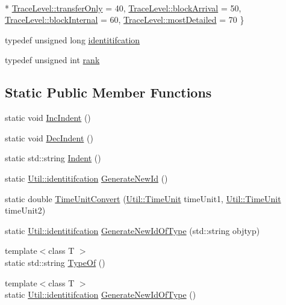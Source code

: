 \begin{DoxyCompactItemize}
\\*
\hyperlink{class_util_a0a3482cfa2d915e261c0cf528fdc7afca0a2e7262b7e0ff948fd4a57e7cb178b6}{Trace\-Level\-::transfer\-Only} = 40, 
\hyperlink{class_util_a0a3482cfa2d915e261c0cf528fdc7afcaa784e286f1dae00f9b31823faa5ee90b}{Trace\-Level\-::block\-Arrival} = 50, 
\hyperlink{class_util_a0a3482cfa2d915e261c0cf528fdc7afca08756a99ac8340cce8bab9de954d738e}{Trace\-Level\-::block\-Internal} = 60, 
\hyperlink{class_util_a0a3482cfa2d915e261c0cf528fdc7afcaac18d2ea075dba67f95df9a907eee741}{Trace\-Level\-::most\-Detailed} = 70
 \}
\item 
typedef unsigned long \hyperlink{class_util_ad17d458d9344b10bba64347e514d6d71}{identitifcation}
\item 
typedef unsigned int \hyperlink{class_util_a2a402b3a3a889d699bb3a1a87cbe6d1e}{rank}
\end{DoxyCompactItemize}
\subsection*{Static Public Member Functions}
\begin{DoxyCompactItemize}
\item 
static void \hyperlink{class_util_a8110241a80979c8fbecca95eef59e9ad}{Inc\-Indent} ()
\item 
static void \hyperlink{class_util_a702d44544c3dd604b81e578ee9ee713f}{Dec\-Indent} ()
\item 
static std\-::string \hyperlink{class_util_a13a4cb5dbc88ef5e2c3a127362b956d6}{Indent} ()
\item 
static \hyperlink{class_util_ad17d458d9344b10bba64347e514d6d71}{Util\-::identitifcation} \hyperlink{class_util_a59ecba8027c38a9d0a3a0e9e9dc94ad7}{Generate\-New\-Id} ()
\item 
static double \hyperlink{class_util_a5f537febaa83db4721745a4730657bab}{Time\-Unit\-Convert} (\hyperlink{class_util_a28504cc2fecc9aa47154cba4e625ec6f}{Util\-::\-Time\-Unit} time\-Unit1, \hyperlink{class_util_a28504cc2fecc9aa47154cba4e625ec6f}{Util\-::\-Time\-Unit} time\-Unit2)
\item 
static \hyperlink{class_util_ad17d458d9344b10bba64347e514d6d71}{Util\-::identitifcation} \hyperlink{class_util_a96dd76236d7f5888b8dac562e93f9278}{Generate\-New\-Id\-Of\-Type} (std\-::string objtyp)
\item 
{\footnotesize template$<$class T $>$ }\\static std\-::string \hyperlink{class_util_a1010d1207367e48e1d417381f32abf1f}{Type\-Of} ()
\item 
{\footnotesize template$<$class T $>$ }\\static \hyperlink{class_util_ad17d458d9344b10bba64347e514d6d71}{Util\-::identitifcation} \hyperlink{class_util_aec5f31f4f467113c25a6aef7bb5f4a40}{Generate\-New\-Id\-Of\-Type} ()
\end{DoxyCompactItemize}


